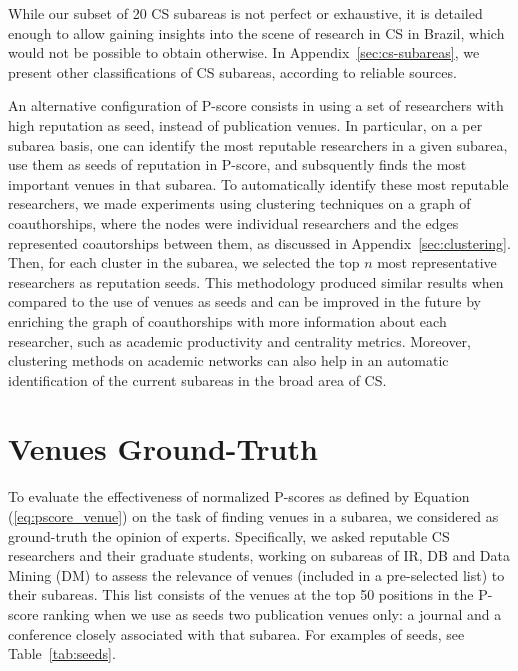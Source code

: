 \documentclass[msc]{ppgccufmg}
\begin{document}
{\color{blue}
%
While our subset of 20 CS subareas is not perfect or exhaustive, it is detailed enough to allow gaining insights into the scene of research in CS in Brazil, which would not be possible to obtain otherwise. In Appendix~\ref{sec:cs-subareas}, we present other classifications of CS subareas, according to reliable sources.

An alternative configuration of P-score consists in using a set of researchers with high reputation as seed, instead of publication venues. In particular, on a per subarea basis, one can identify the most reputable researchers in a given subarea, use them as seeds of reputation in P-score, and subsquently finds the most important venues in that subarea. To automatically identify these most reputable researchers, we made experiments using clustering techniques on a graph of coauthorships, where the nodes were individual researchers and the edges represented coautorships between them, as discussed in Appendix~\ref{sec:clustering}. Then, for each cluster in the subarea, we selected the top $n$ most representative researchers as reputation seeds. This methodology produced similar results when compared to the use of venues as seeds and can be improved in the future by enriching the graph of coauthorships with more information about each researcher, such as academic productivity and centrality metrics. Moreover, clustering methods on academic networks can also help in an automatic identification of the current subareas in the broad area of CS.
}

\section{Venues Ground-Truth}\label{sec:venue-ground-truth}

To evaluate the effectiveness of normalized P-scores as defined by Equation (\ref{eq:pscore_venue}) on the task of finding venues in a subarea, we considered as ground-truth the opinion of experts. Specifically, we asked reputable CS researchers and their graduate students, working on subareas of IR, DB and Data Mining (DM) to assess the relevance of venues (included in a pre-selected list) to their subareas. This list consists of the venues at the top 50 positions in the P-score ranking when we use as seeds two publication venues only: a journal and a conference closely associated with that subarea. For examples of seeds, see Table~\ref{tab:seeds}.
\end{document}
